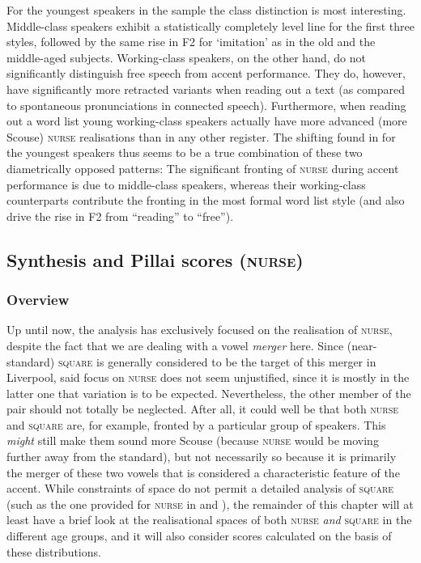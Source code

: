 For the youngest speakers in the sample the class distinction is most interesting.
Middle-class speakers exhibit a statistically completely level line for the first three styles, followed by the same rise in F2 for `imitation' as in the old and the middle-aged subjects.
Working-class speakers, on the other hand, do not significantly distinguish free speech from accent performance.
They do, however, have significantly more retracted variants when reading out a text (as compared to spontaneous pronunciations in connected speech).
Furthermore, when reading out a word list young working-class speakers actually have more advanced (more Scouse) \textsc{nurse} realisations than in any other register.
The shifting found in  for the youngest speakers thus seems to be a true combination of these two diametrically opposed patterns: The significant fronting of \textsc{nurse} during accent performance is due to middle-class speakers, whereas their working-class counterparts contribute the fronting in the most formal word list style (and also drive the rise in F2 from ``reading'' to ``free'').

\subsection{Synthesis and Pillai scores (\textsc{nurse})}
\label{sec.prod.res.vow.nurse.pil}

\subsubsection{Overview}
Up until now, the analysis has exclusively focused on the realisation of \textsc{nurse}, despite the fact that we are dealing with a vowel \emph{merger} here.
Since (near-stan\-dard) \textsc{square} is generally considered to be the target of this merger in Liverpool, said focus on \textsc{nurse} does not seem unjustified, since it is mostly in the latter one that variation is to be expected.
Nevertheless, the other member of the pair should not totally be neglected.
After all, it could well be that both \textsc{nurse} and \textsc{square} are, for example, fronted by a particular group of speakers.
This \emph{might} still make them sound more Scouse (because \textsc{nurse} would be moving further away from the standard), but not necessarily so because it is primarily the merger of these two vowels that is considered a characteristic feature of the accent.
While constraints of space do not permit a detailed analysis of \textsc{square} (such as the one provided for \textsc{nurse} in  and ), the remainder of this chapter will at least have a brief look at the realisational spaces of both \textsc{nurse} \emph{and} \textsc{square} in the different age groups, and it will also consider  scores calculated on the basis of these distributions.

